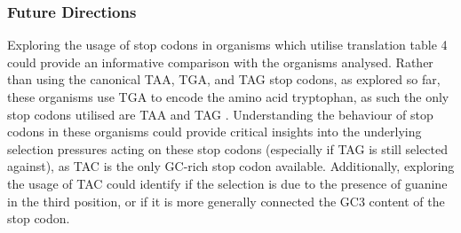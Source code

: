 \documentclass[../main.tex]{subfile}
\begin{document}
    \subsubsection{Future Directions}
        Exploring the usage of stop codons in organisms which utilise translation table 4 could provide an informative comparison with the organisms analysed. Rather than using the canonical TAA, TGA, and TAG stop codons, as explored so far, these organisms use TGA to encode the amino acid tryptophan, as such the only stop codons utilised are TAA and TAG \autocite{translationTable}. Understanding the behaviour of stop codons in these organisms could provide critical insights into the underlying selection pressures acting on these stop codons (especially if TAG is still selected against), as TAC is the only GC-rich stop codon available. Additionally, exploring the usage of TAC could identify if the selection is due to the presence of guanine in the third position, or if it is more generally connected the GC3 content of the stop codon.







\end{document}
